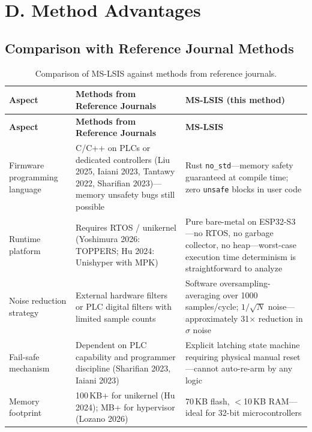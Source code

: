 \documentclass[11pt,a4paper]{article}
\begin{document}
\section{D. Method Advantages}

\subsection*{Comparison with Reference Journal Methods}

\begin{longtable}{@{}p{4cm} p{5cm} p{5cm}@{}}
\caption{Comparison of MS-LSIS against methods from reference journals.}\label{tab:perbandingan}\\
\toprule
\textbf{Aspect} & \textbf{Methods from Reference Journals} & \textbf{MS-LSIS (this method)}\\
\midrule
\endfirsthead
\toprule
\textbf{Aspect} & \textbf{Methods from Reference Journals} & \textbf{MS-LSIS}\\
\midrule
\endhead
\bottomrule
\endlastfoot

Firmware programming language & C/C++ on PLCs or dedicated controllers (Liu 2025, Iaiani 2023, Tantawy 2022, Sharifian 2023)---memory unsafety bugs still possible & Rust \texttt{no\_std}---memory safety guaranteed at compile time; zero \texttt{unsafe} blocks in user code\\

Runtime platform & Requires RTOS / unikernel (Yoshimura 2026: TOPPERS; Hu 2024: Unishyper with MPK) & Pure bare-metal on ESP32-S3---no RTOS, no garbage collector, no heap---worst-case execution time determinism is straightforward to analyze\\

Noise reduction strategy & External hardware filters or PLC digital filters with limited sample counts & Software oversampling-averaging over 1000 samples/cycle; $1/\sqrt{N}$ noise---approximately 31$\times$ reduction in $\sigma$ noise\\

Fail-safe mechanism & Dependent on PLC capability and programmer discipline (Sharifian 2023, Iaiani 2023) & Explicit latching state machine requiring physical manual reset---cannot auto-re-arm by any logic\\

Memory footprint & 100\,KB+ for unikernel (Hu 2024); MB+ for hypervisor (Lozano 2026) & 70\,KB flash, $<$10\,KB RAM---ideal for 32-bit microcontrollers\\


\end{longtable}
\end{document}
